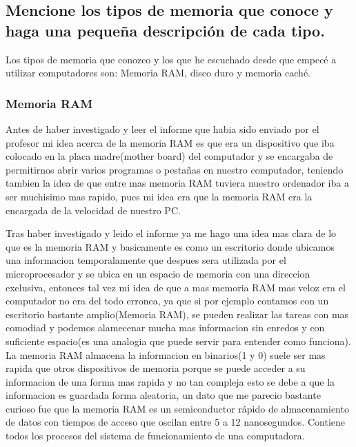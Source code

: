 \documentclass{article}
\begin{document}
\subsection{Mencione los tipos de memoria que conoce y haga una pequeña descripción de cada tipo.}
\noindent
Los tipos de memoria que conozco y los que he escuchado desde que empecé a utilizar computadores son: Memoria RAM, disco duro y memoria caché.
\subsubsection{Memoria RAM}
\noindent
Antes de haber investigado y leer el informe que habia sido enviado por el profesor mi idea acerca de la memoria RAM es que era un dispositivo que iba colocado en la placa madre(mother board) del computador y se encargaba de permitirnos abrir varios programas o pestañas en nuestro computador, teniendo tambien la idea de que entre mas memoria RAM tuviera nuestro ordenador iba a ser muchisimo mas rapido, pues mi idea era que la memoria RAM era la encargada de la velocidad de nuestro PC.

\vspace{0.5cm}
\noindent
Tras haber investigado y leido el informe ya me hago una idea mas clara de lo que es la memoria RAM y basicamente es como un escritorio donde ubicamos una informacion temporalamente que despues sera utilizada por el microprocesador y se ubica en un espacio de memoria con una direccion exclusiva, entonces tal vez mi idea de que a mas memoria RAM mas veloz era el computador no era del todo erronea, ya que si por ejemplo contamos con un escritorio bastante amplio(Memoria RAM), se pueden realizar las tareas con mas comodiad y podemos alamecenar mucha mas informacion sin enredos y con suficiente espacio(es una analogia que puede servir para entender como funciona). La memoria RAM almacena la informacion en binarios(1 y 0) suele ser mas rapida que otros dispositivos de memoria porque se puede acceder a su informacion de una forma mas rapida y no tan compleja esto se debe a que la informacion es guardada forma aleatoria, un dato que me parecio bastante curioso fue que la memoria RAM es un semiconductor rápido de almacenamiento de datos con tiempos de acceso que oscilan entre 5 a 12 nanosegundos. Contiene todos los procesos del sistema de funcionamiento de una computadora. \cite{geniolandia}
\end{document}
